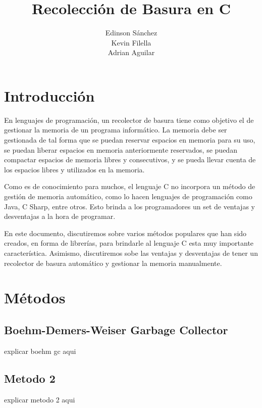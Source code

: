 \documentclass[11pt]{article} %
\title{Recolección de Basura en C}
\author{Edinson Sánchez\\Kevin Filella\\Adrian Aguilar}
\begin{document}
\maketitle



\newpage
\tableofcontents
\newpage

\section{Introducción}
	En lenguajes de programación, un recolector de basura tiene como objetivo el de gestionar la memoria de un programa informático. La memoria debe ser gestionada de tal forma que se puedan reservar espacios en memoria para su uso, se puedan liberar espacios en memoria anteriormente reservados, se puedan compactar espacios de memoria libres y consecutivos, y se pueda llevar cuenta de los espacios libres y utilizados en la memoria.

	Como es de conocimiento para muchos, el lenguaje C no incorpora un método de gestión de memoria automático, como lo hacen lenguajes de programación como Java, C Sharp, entre otros. Esto brinda a los programadores un set de ventajas y desventajas a la hora de programar.

	En este documento, discutiremos sobre varios métodos populares que han sido creados, en forma de librerías, para brindarle al lenguaje C esta muy importante característica. Asimismo, discutiremos sobe las ventajas y desventajas de tener un recolector de basura automático y gestionar la memoria manualmente.

\section{Métodos}

\subsection{Boehm-Demers-Weiser Garbage Collector}
explicar boehm gc aqui

\subsection{Metodo 2}
explicar metodo 2 aqui
\end{document}

